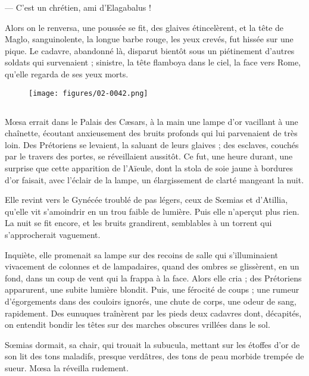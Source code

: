 \documentclass[a4paper, 11pt, oneside, polutonikogreek, french]{article}
\begin{document}
--- C'est un chrétien, ami d'Elagabalus !

Alors on le renversa, une poussée se fit, des glaives étincelèrent, et la tête de Maglo, sanguinolente, la longue barbe rouge, les yeux crevés, fut hissée sur une pique. Le cadavre, abandonné là, disparut bientôt sous un piétinement d'autres soldats qui survenaient ; sinistre, la tête flamboya dans le ciel, la face vers Rome, qu'elle regarda de ses yeux morts.
\begin{figure}[H]
\centering
\texttt{[image: figures/02-0042.png]}
\end{figure}
\clearpage
\subsection{}
\paragraph{}
Mœsa errait dans le Palais des Cæsars, à la main une lampe d'or vacillant à une chaînette, écoutant anxieusement des bruits profonds qui lui parvenaient de très loin. Des Prétoriens se levaient, la saluant de leurs glaives ; des esclaves, couchés par le travers des portes, se réveillaient aussitôt. Ce fut, une heure durant, une surprise que cette apparition de l'Aïeule, dont la stola de soie jaune à bordures d'or faisait, avec l'éclair de la lampe, un élargissement de clarté mangeant la nuit.

Elle revint vers le Gynécée troublé de pas légers, ceux de Sœmias et d'Atillia, qu'elle vit s'amoindrir en un trou faible de lumière. Puis elle n'aperçut plus rien. La nuit se fit encore, et les bruits grandirent, semblables à un torrent qui s'approcherait vaguement.

Inquiète, elle promenait sa lampe sur des recoins de salle qui s'illuminaient vivacement de colonnes et de lampadaires, quand des ombres se glissèrent, en un fond, dans un coup de vent qui la frappa à la face. Alors elle cria ; des Prétoriens apparurent, une subite lumière blondit. Puis, une férocité de coups ; une rumeur d'égorgements dans des couloirs ignorés, une chute de corps, une odeur de sang, rapidement. Des eunuques traînèrent par les pieds deux cadavres dont, décapités, on entendit bondir les têtes sur des marches obscures vrillées dans le sol.

Sœmias dormait, sa chair, qui trouait la subucula, mettant sur les étoffes d'or de son lit des tons maladifs, presque verdâtres, des tons de peau morbide trempée de sueur. Mœsa la réveilla rudement.
\end{document}
